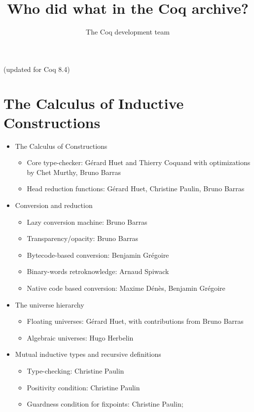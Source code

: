 \documentclass{article}
\begin{document}
\title{Who did what in the Coq archive?}

\author{The Coq development team}

\maketitle

\centerline{(updated for Coq 8.4)}

\section{The Calculus of Inductive Constructions}

\begin{itemize}
\item The Calculus of Constructions
  \begin{itemize}
  \item Core type-checker: Gérard Huet and Thierry Coquand with
    optimizations by Chet Murthy, Bruno Barras
  \item Head reduction functions: Gérard Huet, Christine Paulin, Bruno Barras
  \end{itemize}
\item Conversion and reduction
  \begin{itemize}
  \item Lazy conversion machine: Bruno Barras
  \item Transparency/opacity: Bruno Barras
  \item Bytecode-based conversion: Benjamin Grégoire
  \item Binary-words retroknowledge: Arnaud Spiwack 
  \item Native code based conversion: Maxime Dénès, Benjamin Grégoire
  \end{itemize}
\item The universe hierarchy
  \begin{itemize}
  \item Floating universes: Gérard Huet, with contributions from Bruno Barras
  \item Algebraic universes: Hugo Herbelin
  \end{itemize}
\item Mutual inductive types and recursive definitions
  \begin{itemize}
  \item Type-checking: Christine Paulin
  \item Positivity condition: Christine Paulin
  \item Guardness condition for fixpoints: Christine Paulin;

\end{itemize}
\end{itemize}
\end{document}
